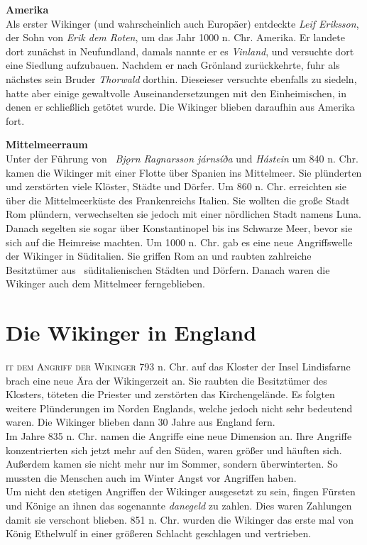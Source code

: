\documentclass[12pt,a4paper,ngerman,openany]{book}
\newcommand{\flettrine}[2]{\lettrine[lines=2, depth=0, loversize=0.25, nindent=0.69pt, lraise=0.15]{\initfamily{#1}}{#2}}
\newcommand*\initfamily{\usefont{U}{GotIn}{xl}{n}}
\begin{document}
\textbf{Amerika}\\
Als erster Wikinger (und wahrscheinlich auch Europäer) entdeckte \textit{Leif Eriksson}, der Sohn von \textit{Erik dem Roten}, um das Jahr 1000 n. Chr. Amerika. Er landete dort zunächst in Neufundland, damals nannte er es \textit{Vinland}, und versuchte dort eine Siedlung aufzubauen. Nachdem er nach Grönland zurückkehrte, fuhr als nächstes sein Bruder \textit{Thorwald} dorthin. Dieseieser versuchte ebenfalls zu siedeln, hatte aber einige gewaltvolle Auseinandersetzungen mit den Einheimischen, in denen er schließlich getötet wurde. Die Wikinger blieben daraufhin aus Amerika fort.

\textbf{Mittelmeerraum}\\
Unter der Führung von  \textit{Bjǫrn Ragnarsson járnsíða} und \textit{Hástein} um 840 n. Chr. kamen die Wikinger mit einer Flotte über Spanien ins Mittelmeer. Sie plünderten und zerstörten viele Klöster, Städte und Dörfer. Um 860 n. Chr. erreichten sie über die Mittelmeerküste des Frankenreichs Italien. Sie wollten die große Stadt Rom plündern, verwechselten sie jedoch mit einer nördlichen Stadt namens Luna. Danach segelten sie sogar über Konstantinopel bis ins Schwarze Meer, bevor sie sich auf die Heimreise machten. Um 1000 n. Chr. gab es eine neue Angriffswelle der Wikinger in Süditalien. Sie griffen Rom an und raubten zahlreiche Besitztümer aus  süditalienischen Städten und Dörfern.
Danach waren die Wikinger auch dem Mittelmeer ferngeblieben.

\section{Die Wikinger in England}
\flettrine{M}{it dem Angriff der Wikinger} 793 n. Chr. auf das Kloster der Insel Lindisfarne brach eine neue Ära der Wikingerzeit an. Sie raubten die Besitztümer des Klosters, töteten die Priester und zerstörten das Kirchengelände. Es folgten weitere Plünderungen im Norden Englands, welche jedoch nicht sehr bedeutend waren. Die Wikinger blieben dann 30 Jahre aus England fern. \\
Im Jahre 835 n. Chr. namen die Angriffe eine neue Dimension an. Ihre Angriffe konzentrierten sich jetzt mehr auf den Süden, waren größer und häuften sich. Außerdem kamen sie nicht mehr nur im Sommer, sondern überwinterten. So mussten die Menschen auch im Winter Angst vor Angriffen haben. \\
Um nicht den stetigen Angriffen der Wikinger ausgesetzt zu sein, fingen Fürsten und Könige an ihnen das sogenannte \textit{danegeld} zu zahlen. Dies waren Zahlungen damit sie verschont blieben.
851 n. Chr. wurden die Wikinger das erste mal von König Ethelwulf in einer größeren Schlacht geschlagen und vertrieben.
\end{document}
